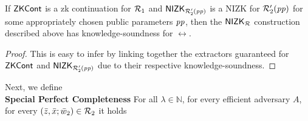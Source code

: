 \begin{lemma} 
\label{le:KS_for_nizkR}
If ${\mathsf{ZKCont}}$ is a zk continuation for $\mathcal{R}_1$ and ${\mathsf{NIZK_{\mathcal{R}'_2(\mathit{pp})}}}$ is a NIZK for $\mathcal{R}_2'(\mathit{pp})$ for some appropriately chosen public parameters $\mathit{pp}$, 
then the ${\mathsf{NIZK_{\mathcal{R}}}}$ construction described above has knowledge-soundness for $\rel$. 
\end{lemma} 
\begin{proof}This is easy to infer by linking together the extractors guaranteed for ${\mathsf{ZKCont}}$ and ${\mathsf{NIZK_{\mathcal{R}'_2(\mathit{pp})}}}$ due to their respective 
knowledge-soundness.
\end{proof}
 \noindent Next, we define \\ 
\noindent \textbf{Special Perfect Completeness} For all $\lambda \in \mathbb{N}$, for every efficient adversary $A$, for every 
 $(\bar{z}, \bar{x}; \bar{w}_2) \in \mathcal{R}_2$ it holds
